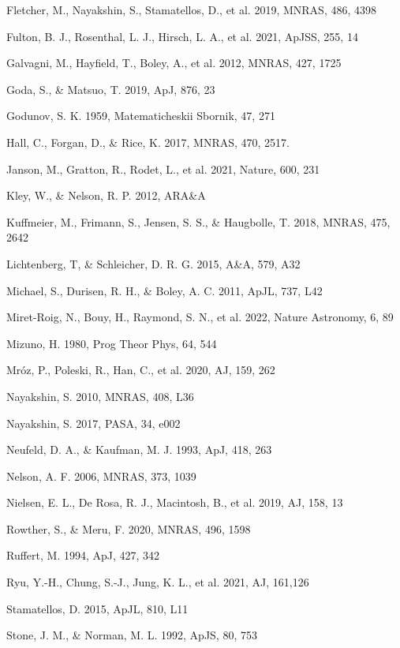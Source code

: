 \documentclass[12pt,preprint]{aastex}
\begin{document}
\begin{references}
Fletcher, M., Nayakshin, S., Stamatellos, D., et al. 2019, MNRAS, 486, 4398

Fulton, B. J., Rosenthal, L. J., Hirsch, L. A., et al. 2021, ApJSS, 255, 14

Galvagni, M., Hayfield, T., Boley, A., et al. 2012, MNRAS, 427, 1725

Goda, S., \& Matsuo, T. 2019, ApJ, 876, 23

Godunov, S. K. 1959, Matematicheskii Sbornik, 47, 271

Hall, C., Forgan, D., \& Rice, K. 2017, MNRAS, 470, 2517.

Janson, M., Gratton, R., Rodet, L., et al. 2021, Nature, 600, 231

Kley, W., \& Nelson, R. P. 2012, ARA\&A

Kuffmeier, M., Frimann, S., Jensen, S. S., \& Haugbolle, T. 2018, MNRAS, 475, 2642

Lichtenberg, T, \& Schleicher, D. R. G. 2015, A\&A, 579, A32

Michael, S., Durisen, R. H., \& Boley, A. C. 2011, ApJL, 737, L42

Miret-Roig, N.,  Bouy, H., Raymond, S. N., et al. 2022, Nature Astronomy, 6, 89

Mizuno, H. 1980, Prog Theor Phys, 64, 544

Mr\'oz, P., Poleski, R., Han, C., et al. 2020, AJ, 159, 262

Nayakshin, S. 2010, MNRAS, 408, L36

Nayakshin, S. 2017, PASA, 34, e002

Neufeld, D. A., \& Kaufman, M. J. 1993, ApJ, 418, 263

Nelson, A. F. 2006, MNRAS, 373, 1039

Nielsen, E. L., De Rosa, R. J., Macintosh, B., et al. 2019, AJ, 158, 13

Rowther, S., \& Meru, F. 2020, MNRAS, 496, 1598

Ruffert, M. 1994, ApJ, 427, 342

Ryu, Y.-H., Chung, S.-J., Jung, K. L., et al. 2021, AJ, 161,126

Stamatellos, D. 2015, ApJL, 810, L11

Stone, J. M., \& Norman, M. L. 1992, ApJS, 80, 753


\end{references}
\end{document}
